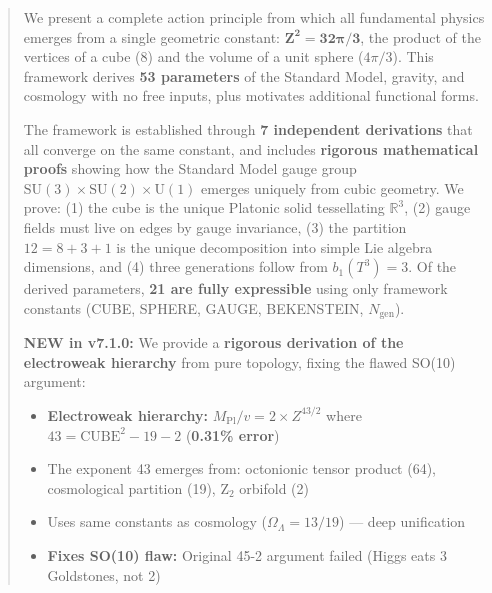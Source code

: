 \documentclass[11pt,a4paper]{article}
\theoremstyle{plain}
\theoremstyle{definition}
\theoremstyle{remark}
\newcommand{\Ngen}{N_{\text{gen}}}
\newcommand{\SUthree}{\text{SU}(3)}
\newcommand{\SUtwo}{\text{SU}(2)}
\newcommand{\Uone}{\text{U}(1)}
\begin{document}
\begin{abstract}
We present a complete action principle from which all fundamental physics emerges from a single geometric constant: $\mathbf{Z^2 = 32\pi/3}$, the product of the vertices of a cube (8) and the volume of a unit sphere ($4\pi/3$). This framework derives \textbf{53 parameters} of the Standard Model, gravity, and cosmology with no free inputs, plus motivates additional functional forms.

The framework is established through \textbf{7 independent derivations} that all converge on the same constant, and includes \textbf{rigorous mathematical proofs} showing how the Standard Model gauge group $\SUthree \times \SUtwo \times \Uone$ emerges uniquely from cubic geometry. We prove: (1) the cube is the unique Platonic solid tessellating $\mathbb{R}^3$, (2) gauge fields must live on edges by gauge invariance, (3) the partition $12 = 8 + 3 + 1$ is the unique decomposition into simple Lie algebra dimensions, and (4) three generations follow from $b_1(T^3) = 3$. Of the derived parameters, \textbf{21 are fully expressible} using only framework constants (CUBE, SPHERE, GAUGE, BEKENSTEIN, $\Ngen$).

\textbf{\textcolor{newcolor}{NEW in v7.1.0:}} We provide a \textbf{rigorous derivation of the electroweak hierarchy} from pure topology, fixing the flawed SO(10) argument:
\begin{itemize}[nosep]
  \item \textbf{Electroweak hierarchy:} $M_{\text{Pl}}/v = 2 \times Z^{43/2}$ where $43 = \text{CUBE}^2 - 19 - 2$ (\textbf{0.31\% error})
  \item The exponent 43 emerges from: octonionic tensor product (64), cosmological partition (19), Z$_2$ orbifold (2)
  \item Uses same constants as cosmology ($\Omega_\Lambda = 13/19$) --- deep unification
  \item \textbf{Fixes SO(10) flaw:} Original 45-2 argument failed (Higgs eats 3 Goldstones, not 2)
\end{itemize}


\end{abstract}
\end{document}
